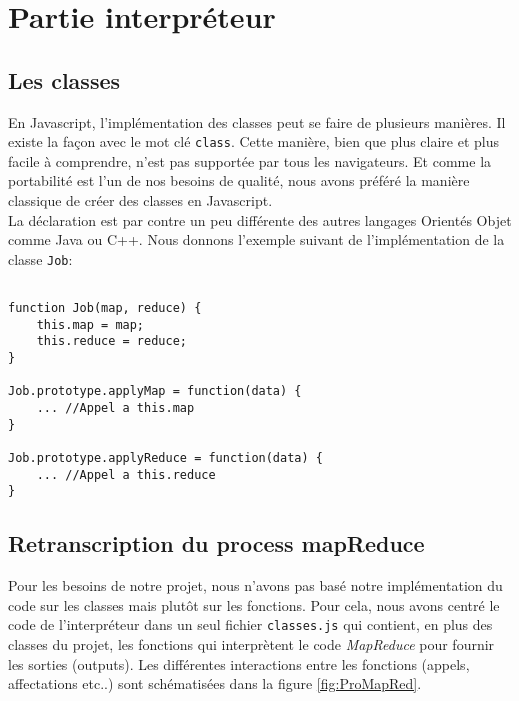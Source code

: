 \newpage
\section{Partie interpréteur}

\subsection{Les classes}

En Javascript, l'implémentation des classes peut se faire de plusieurs manières. Il existe la façon avec le mot clé {\tt class}. Cette manière, bien que plus claire et plus facile à comprendre, n'est pas supportée par tous les navigateurs. Et comme la portabilité est l'un de nos besoins de qualité, nous avons préféré la manière classique de créer des classes en Javascript.\\

La déclaration est par contre un peu différente des autres langages Orientés Objet comme Java ou C++. Nous donnons l'exemple suivant de l'implémentation de la classe {\tt Job}:\\

\begin{lstlisting}

function Job(map, reduce) { 
    this.map = map;
    this.reduce = reduce;
}

Job.prototype.applyMap = function(data) {
	... //Appel a this.map 
}

Job.prototype.applyReduce = function(data) {
    ... //Appel a this.reduce
}

\end{lstlisting}


\subsection{Retranscription du process mapReduce}

Pour les besoins de notre projet, nous n'avons pas basé notre implémentation du code sur les classes mais plutôt sur les fonctions. Pour cela, nous avons centré le code de l'interpréteur dans un seul fichier {\tt classes.js} qui contient, en plus des classes du projet, les fonctions qui interprètent le code {\it MapReduce} pour fournir les sorties (outputs). Les différentes interactions entre les fonctions (appels, affectations etc..) sont schématisées dans la figure \ref{fig:ProMapRed}.\\

